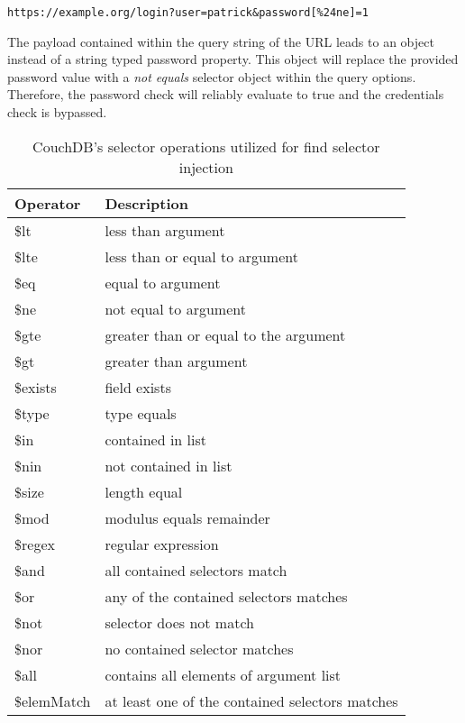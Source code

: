 \begin{lstlisting}[caption={Attack vector on CouchDB for speical key injection via HTTP GET}, label={lst:FindSelectorInjectionAttack}]
https://example.org/login?user=patrick&password[%24ne]=1
\end{lstlisting}

The payload contained within the query string of the URL leads to an object instead of a string typed password property. This object will replace the provided password value with a \emph{not equals} selector object within the query options. Therefore, the password check will reliably evaluate to true and the credentials check is bypassed. \\

\begin{table}[h]
 \sffamily
 \centering
 \begin{tabular}{ll}
  \textbf{Operator} & \textbf{Description} \\ \hline
  \$lt      & less than argument\\
  \$lte     & less than or equal to argument \\
  \$eq      & equal to argument \\
  \$ne      & not equal to argument \\
  \$gte     & greater than or equal to the argument \\
  \$gt      & greater than argument \\
  \$exists  & field exists \\
  \$type    & type equals \\
  \$in      & contained in list \\
  \$nin     & not contained in list \\
  \$size    & length equal \\
  \$mod     & modulus equals remainder \\
  \$regex   & regular expression \\
  \$and     & all contained selectors match \\
  \$or      & any of the contained selectors matches \\
  \$not     & selector does not match \\
  \$nor     & no contained selector matches \\
  \$all     & contains all elements of argument list \\ 
  \$elemMatch & at least one of the contained selectors matches \\
  \bottomrule 
 \end{tabular}
 \caption{CouchDB's selector operations utilized for find selector injection}
 \label{tab:couchdb_affected_selectors}
\end{table}

